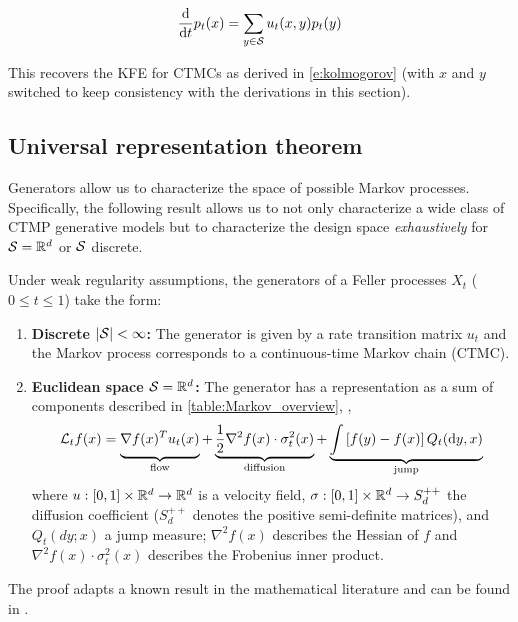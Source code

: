 \documentclass{fairmeta}
\numberwithin{equation}{section}
\begin{document}
\begin{myframe}
\begin{equation}
   \frac{\mathrm{d}}{\mathrm{d} t} p_t(x) = \sum\limits_{y\in {\mathcal{S}}}u_t(x,y)p_t(y)
\end{equation}
\end{myframe}
This recovers the KFE for CTMCs as derived in \cref{e:kolmogorov} (with $x$ and $y$ switched to keep consistency with the derivations in this section). 

\pagebreak
\subsection{Universal representation theorem}
Generators allow us to characterize the space of possible Markov processes. Specifically, the following result allows us to not only characterize a wide class of CTMP generative models but to characterize the design space \emph{exhaustively} for ${\mathcal{S}}=\mathbb{R}^d$ or ${\mathcal{S}}$ discrete.
\begin{theorem} 
\label{theorem:representation} Under weak regularity assumptions, the generators of a Feller processes $X_t$ ($0\leq t\leq 1$) take the form:
\begin{enumerate}
\vspace{-0.5em}
\item \textbf{Discrete $|{\mathcal{S}}|<\infty$:} The generator is given by a rate transition matrix $u_t$ and the Markov process corresponds to a continuous-time Markov chain (CTMC). 
\vspace{-0.5em}
\item \textbf{Euclidean space  ${\mathcal{S}}=\mathbb{R}^d$:} The generator has a representation as a sum of components described in \cref{table:Markov_overview}, \ie,
\begin{align}
\label{eq:universal_representation}
    \mathcal{L}_tf(x) = \underbrace{\vphantom{\frac{1}{2}}\nabla f(x)^T u_t(x)}_{\text{flow}}+\underbrace{\frac{1}{2}\nabla^2 f(x) \cdot \sigma^2_t(x)}_{\text{diffusion}}+\underbrace{\int \brac{f(y)-f(x)}Q_t(\dd y,x)}_{\text{jump}}
\end{align}
where $u:[0,1]\times\mathbb R^d\rightarrow\mathbb R^d$ is a velocity field, $\sigma:[0,1]\times\mathbb R^d\rightarrow S^{++}_d$ the diffusion coefficient ($S^{++}_d$ denotes the positive semi-definite matrices), and $Q_t(dy;x)$ a jump measure; $\nabla^2 f(x)$ describes the Hessian of $f$ and $\nabla^2 f(x) \cdot \sigma^2_t(x)$ describes the Frobenius inner product.
\end{enumerate}
\end{theorem}
The proof adapts a known result in the mathematical literature \citep{courrege1965forme, von1965fast} and can be found in \citep{holderrieth2024gm}.
\end{document}
